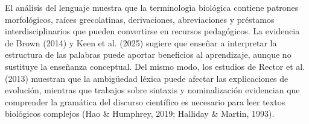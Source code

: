 \documentclass[12pt]{article}
\begin{document}
El análisis del lenguaje muestra que la terminologìa biológica contiene patrones morfológicos, raíces grecolatinas, derivaciones, abreviaciones y préstamos interdisciplinarios que pueden convertirse en recursos pedagógicos. La evidencia de Brown (2014) y Keen et al. (2025) sugiere que enseñar a interpretar la estructura de las palabras puede aportar beneficios al aprendizaje, aunque no sustituye la enseñanza conceptual. Del mismo modo, los estudios de Rector et al. (2013) muestran que la ambigüedad léxica puede afectar las explicaciones de evolución, mientras que trabajos sobre sintaxis y nominalización evidencian que comprender la gramática del discurso científico es necesario para leer textos biológicos complejos (Hao & Humphrey, 2019; Halliday & Martin, 1993).
\end{document}

